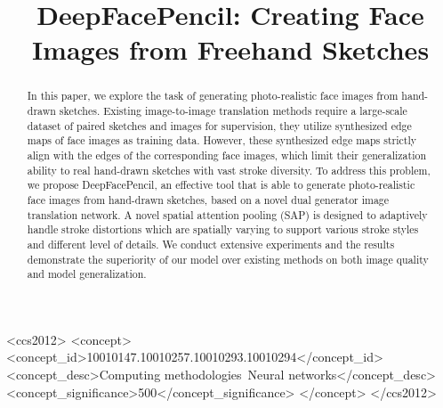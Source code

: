 \documentclass[sigconf,anonymous,review]{acmart}
\newcommand{\dlt}[1]{}
\begin{document}
\title{DeepFacePencil: Creating Face Images from Freehand Sketches}

\begin{abstract}
In this paper, we explore the task of generating photo-realistic face images from hand-drawn sketches. 
%
Existing image-to-image translation methods require a large-scale dataset of paired sketches and images for supervision, they utilize synthesized edge maps of face images as training data. 
However, these synthesized edge maps strictly align with the edges of the corresponding face images, which limit their generalization ability to real hand-drawn sketches with vast stroke diversity. 
To address this problem, we propose DeepFacePencil, an effective tool that is able to generate photo-realistic face images from hand-drawn sketches, based on a novel dual generator image translation network. 
%
A novel spatial attention pooling (SAP) is designed to adaptively handle stroke distortions which are spatially varying to support various stroke styles and different level of details.
We conduct extensive experiments and the results demonstrate the superiority of our model over existing methods on both image quality and model generalization.
\end{abstract}

%
\begin{CCSXML}
	<ccs2012>
	<concept>
	<concept_id>10010147.10010257.10010293.10010294</concept_id>
	<concept_desc>Computing methodologies~Neural networks</concept_desc>
	<concept_significance>500</concept_significance>
	</concept>
	</ccs2012>
\end{CCSXML}



%
%



\dlt{
\begin{teaserfigure}
	\texttt{[image: figs/teaser.png]}
	\caption{This is a teaser}
	\label{fig:teaser}
\end{teaserfigure}
}
\end{document}

